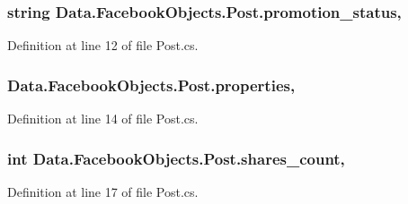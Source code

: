 \subsubsection[{\texorpdfstring{promotion\+\_\+status}{promotion_status}}]{\setlength{\rightskip}{0pt plus 5cm}string Data.\+Facebook\+Objects.\+Post.\+promotion\+\_\+status\hspace{0.3cm}{\ttfamily [get]}, {\ttfamily [set]}}\hypertarget{class_data_1_1_facebook_objects_1_1_post_a4fbe2ab37ecd327a18c5f287d68c9053}{}\label{class_data_1_1_facebook_objects_1_1_post_a4fbe2ab37ecd327a18c5f287d68c9053}


Definition at line 12 of file Post.\+cs.

\subsubsection[{\texorpdfstring{properties}{properties}}]{ Data.\+Facebook\+Objects.\+Post.\+properties\hspace{0.3cm}{\ttfamily [get]}, {\ttfamily [set]}}\hypertarget{class_data_1_1_facebook_objects_1_1_post_ab2e3fc0d8e9b75295bdc4ea4a4431ec7}{}\label{class_data_1_1_facebook_objects_1_1_post_ab2e3fc0d8e9b75295bdc4ea4a4431ec7}


Definition at line 14 of file Post.\+cs.

\subsubsection[{\texorpdfstring{shares\+\_\+count}{shares_count}}]{\setlength{\rightskip}{0pt plus 5cm}int Data.\+Facebook\+Objects.\+Post.\+shares\+\_\+count\hspace{0.3cm}{\ttfamily [get]}, {\ttfamily [set]}}\hypertarget{class_data_1_1_facebook_objects_1_1_post_aaa87c76997dad586306046b5f3299978}{}\label{class_data_1_1_facebook_objects_1_1_post_aaa87c76997dad586306046b5f3299978}


Definition at line 17 of file Post.\+cs.

